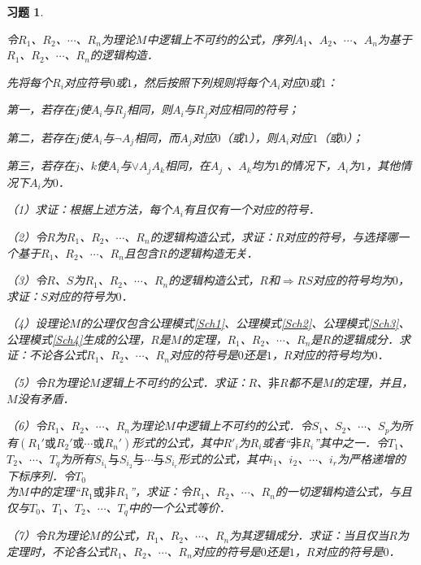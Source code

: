 \documentclass[12pt, a4paper, oneside]{book}
\newtheorem{exer}{习题}
\begin{document}
			\begin{exer}\label{exer34}
				\hfill\par
				令$R_1$、$R_2$、$\cdots$、$R_n$为理论$M$中逻辑上不可约的公式，序列$A_1$、$A_2$、$\cdots$、$A_n$为基于$R_1$、$R_2$、$\cdots$、$R_n$的逻辑构造．
				\par
				先将每个$R_i$对应符号$0$或$1$，然后按照下列规则将每个$A_i$对应$0$或$1$：
				\par
				第一，若存在$j$使$A_i$与$R_j$相同，则$A_i$与$R_j$对应相同的符号；
				\par
				第二，若存在$j$使$A_i$与$\neg A_j$相同，而$A_j$对应$0$（或$1$），则$A_i$对应$1$（或$0$）；
				\par
				第三，若存在$j$、$k$使$A_i$与$\lor A_jA_k$相同，在$A_j$ 、$A_k$均为$1$的情况下，$A_i$为$1$，其他情况下$A_i$为$0$．
				\par
				（1）求证：根据上述方法，每个$A_i$有且仅有一个对应的符号．
				\par
				（2）令$R$为$R_1$、$R_2$、$\cdots$、$R_n$的逻辑构造公式，求证：$R$对应的符号，与选择哪一个基于$R_1$、$R_2$、$\cdots$、$R_n$且包含$R$的逻辑构造无关．
				\par
				（3）令$R$、$S$为$R_1$、$R_2$、$\cdots$、$R_n$的逻辑构造公式，$R$和$\Rightarrow RS$对应的符号均为$0$，求证：$S$对应的符号为$0$．
				\par
				（4）设理论$M$的公理仅包含公理模式\ref{Sch1}、公理模式\ref{Sch2}、公理模式\ref{Sch3}、公理模式\ref{Sch4}生成的公理，$R$是$M$的定理，$R_1$、$R_2$、$\cdots$、$R_n$是$R$的逻辑成分．求证：不论各公式$R_1$、$R_2$、$\cdots$、$R_n$对应的符号是$0$还是$1$，$R$对应的符号均为$0$．
				\par
				（5）令$R$为理论$M$逻辑上不可约的公式．求证：$R$、$\text{非}R$都不是$M$的定理，并且，$M$没有矛盾．
				\par
				（6）令$R_1$、$R_2$、$\cdots$、$R_n$为理论$M$中逻辑上不可约的公式．令$S_1$、$S_2$、$\cdots$、$S_p$为所有$(R_1'\text{或}R_2'\text{或}\cdots\text{或}R_n')$形式的公式，其中${R'}_i$为$R_i$或者“$\text{非}R_i$”其中之一．令$T_1$、$T_2$、$\cdots$、$T_q$为所有$S_{i_1}\text{与}S_{i_2}\text{与}\cdots\text{与}S_{i_r}$形式的公式，其中$i_1$、$i_2$、$\cdots$、$i_r$为严格递增的下标序列．令$T_0$\\为$M$中的定理“$R_1\text{或}\text{非}R_1$”，求证：令$R_1$、$R_2$、$\cdots$、$R_n$的一切逻辑构造公式，与且仅与$T_0$、$T_1$、$T_2$、$\cdots$、$T_q$中的一个公式等价．
				\par
				（7）令$R$为理论$M$的公式，$R_1$、$R_2$、$\cdots$、$R_n$为其逻辑成分．求证：当且仅当$R$为定理时，不论各公式$R_1$、$R_2$、$\cdots$、$R_n$对应的符号是$0$还是$1$，$R$对应的符号是$0$．
			\end{exer}
\end{document}
